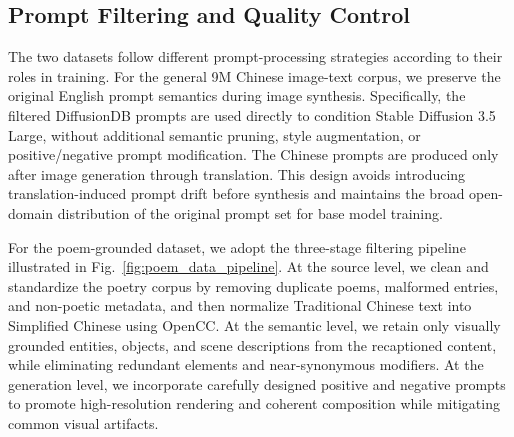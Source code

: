 \subsection{Prompt Filtering and Quality Control}

The two datasets follow different prompt-processing strategies according to their roles in training. For the general 9M Chinese image-text corpus, we preserve the original English prompt semantics during image synthesis. Specifically, the filtered DiffusionDB prompts are used directly to condition Stable Diffusion 3.5 Large, without additional semantic pruning, style augmentation, or positive/negative prompt modification. The Chinese prompts are produced only after image generation through translation. This design avoids introducing translation-induced prompt drift before synthesis and maintains the broad open-domain distribution of the original prompt set for base model training.

For the poem-grounded dataset, we adopt the three-stage filtering pipeline illustrated in Fig.~\ref{fig:poem_data_pipeline}. At the source level, we clean and standardize the poetry corpus by removing duplicate poems, malformed entries, and non-poetic metadata, and then normalize Traditional Chinese text into Simplified Chinese using OpenCC. At the semantic level, we retain only visually grounded entities, objects, and scene descriptions from the recaptioned content, while eliminating redundant elements and near-synonymous modifiers. At the generation level, we incorporate carefully designed positive and negative prompts to promote high-resolution rendering and coherent composition while mitigating common visual artifacts.

